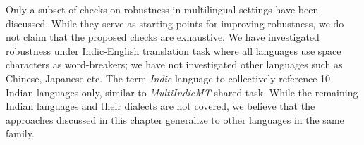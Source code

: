 
Only a subset of checks on robustness in multilingual settings have been discussed. While they serve as starting points for improving robustness, we do not claim that the proposed checks are exhaustive.
We have investigated robustness under Indic-English translation task where all languages use space characters as word-breakers; we have not investigated other languages such as Chinese, Japanese etc.
The term \textit{Indic} language to collectively reference 10 Indian languages only, similar to \textit{MultiIndicMT} shared task. While the remaining Indian languages and their dialects are not covered, 
we believe that the approaches discussed in this chapter generalize to other languages in the same family.
